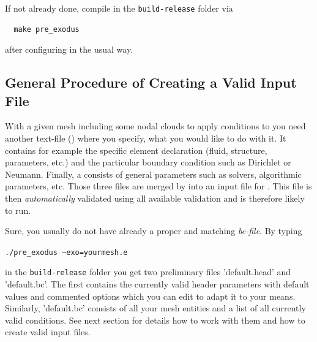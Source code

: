 If not already done, compile \prexo in the \texttt{build-release} folder via
\begin{verbatim}
  make pre_exodus
\end{verbatim}
after configuring \baci{} in the usual way.

\subsection{General Procedure of Creating a Valid \baci{} Input File}
With a given mesh including some nodal clouds to apply conditions to you need
another text-file {(\bc)} where you specify, what you would like to do with
it. It contains for example the specific element declaration (fluid, structure,
parameters, etc.) and the particular boundary condition such as Dirichlet or
Neumann. Finally, a \head consists of general parameters such as
solvers, algorithmic parameters, etc. Those three files are merged by \prexo
into an input file for \baci{}. This file is then \emph{automatically} validated
using all available \baci{} validation and is therefore likely to run.

Sure, you usually do not have already a proper \head and matching \emph{bc-file}. By
typing
\begin{center}
  \texttt{./pre\_exodus --exo=yourmesh.e}
\end{center}
in the \texttt{build-release} folder you get two preliminary files 'default.head' and 'default.bc'. The first contains the currently valid header parameters with default values and commented options which you can edit to adapt it to your means. Similarly, 'default.bc' consists of all your mesh
entities and a list of all currently valid conditions. See next section for
details how to work with them and how to create valid input files.


